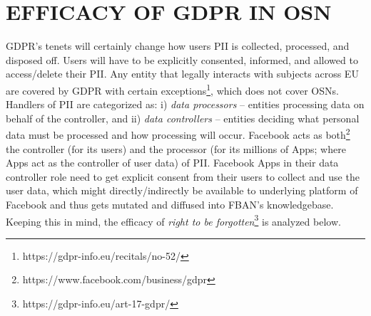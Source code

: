 \documentclass[a4paper,twoside]{article}
\begin{document}


\section{EFFICACY OF GDPR IN OSN}
\label{sec:efficacy}
\noindent GDPR's tenets will certainly change how users PII is
collected, processed, and disposed off. Users will have to be
explicitly consented, informed, and allowed to access/delete their
PII. Any entity that legally interacts with subjects across EU are
covered by GDPR with certain
exceptions\footnote{https://gdpr-info.eu/recitals/no-52/}, which does
not cover OSNs.  Handlers of PII are categorized as: i) \textit{data
  processors} -- entities processing data on behalf of the controller,
and ii) \textit{data controllers} -- entities deciding what personal
data must be processed and how processing will occur. Facebook acts as
both\footnote{https://www.facebook.com/business/gdpr} the controller
(for its users) and the processor (for its millions of Apps; where
Apps act as the controller of user data) of PII. Facebook Apps in
their data controller role need to get explicit consent from their
users to collect and use the user data, which might
directly/indirectly be available to underlying platform of Facebook
and thus gets mutated and diffused into FBAN's knowledgebase. Keeping
this in mind, the efficacy of \textit{right to be
  forgotten}\footnote{https://gdpr-info.eu/art-17-gdpr/} is analyzed
below.
\end{document}
